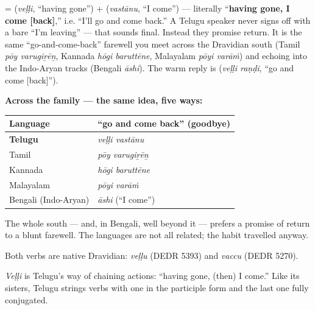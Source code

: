 \begin{cousinweb}
\textbf{ } = \textbf{} (\emph{veḷḷi}, \textquotedblleft{}having gone\textquotedblright{}) + \textbf{} (\emph{vastānu}, \textquotedblleft{}I come\textquotedblright{}) — literally \textquotedblleft{}\textbf{having gone, I come {[}back{]}},\textquotedblright{} i.e. \textquotedblleft{}I'll go and come back.\textquotedblright{} A Telugu speaker never signs off with a bare \textquotedblleft{}I'm leaving\textquotedblright{} — that sounds final. Instead they promise return. It is the same \textquotedblleft{}go-and-come-back\textquotedblright{} farewell you meet across the Dravidian south (Tamil \emph{pōy varugiṟēṉ}, Kannada \emph{hōgi baruttēne}, Malayalam \emph{pōyi varāṁ}) and echoing into the Indo-Aryan tracks (Bengali \emph{āshi}). The warm reply is \textbf{ } (\emph{veḷḷi raṇḍi}, \textquotedblleft{}go and come {[}back{]}\textquotedblright{}).

\textbf{Across the family — the same idea, five ways:}

\noindent
\begin{tabularx}{\linewidth}{@{}>{\raggedright\arraybackslash}X>{\raggedright\arraybackslash}X@{}}
\toprule
\textbf{Language} & \textbf{\textquotedblleft{}go and come back\textquotedblright{} (goodbye)} \\
\midrule
\textbf{Telugu} & \emph{veḷḷi vastānu} \\
Tamil & \emph{pōy varugiṟēṉ} \\
Kannada & \emph{hōgi baruttēne} \\
Malayalam & \emph{pōyi varāṁ} \\
Bengali (Indo-Aryan) & \emph{āshi} (\textquotedblleft{}I come\textquotedblright{}) \\
\bottomrule
\end{tabularx}

The whole south — and, in Bengali, well beyond it — prefers a promise of return to a blunt farewell. The languages are not all related; the habit travelled anyway.

Both verbs are native Dravidian: \emph{veḷḷu} (DEDR 5393) and \emph{vaccu} (DEDR 5270).
\end{cousinweb}

\begin{grammarlens}[title={Grammar Lens: the \textquotedblleft{}having …d\textquotedblright{} participle}]
\emph{Veḷḷi} is Telugu's way of chaining actions: \textquotedblleft{}having gone, (then) I come.\textquotedblright{} Like its sisters, Telugu strings verbs with one in the participle form and the last one fully conjugated.
\end{grammarlens}

